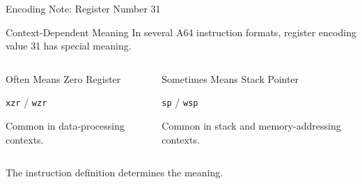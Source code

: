 \documentclass[aspectratio=169,11pt,t]{beamer}
\newcommand{\code}[1]{\texttt{#1}}
\begin{document}
\begin{frame}{Encoding Note: Register Number 31}

\begin{block}{Context-Dependent Meaning}
In several A64 instruction formats,
register encoding value 31
has special meaning.
\end{block}

\vspace{0.15cm}

\begin{columns}[T,onlytextwidth]


\begin{block}{Often Means Zero Register}

\begin{center}
\large
\code{xzr} / \code{wzr}
\end{center}

Common in data-processing contexts.

\end{block}


\begin{block}{Sometimes Means Stack Pointer}

\begin{center}
\large
\code{sp} / \code{wsp}
\end{center}

Common in stack
and memory-addressing contexts.

\end{block}

\end{columns}

\vspace{0.15cm}

\small

The instruction definition
determines the meaning.

\end{frame}



\end{document}

